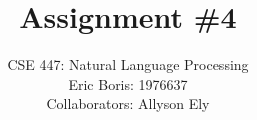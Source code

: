 \title{Assignment \#4} 
\author{\normalsize{CSE 447: Natural Language Processing}\\ 
\normalsize{Eric Boris: 1976637}\\
\normalsize{Collaborators: Allyson Ely}}
\maketitle
